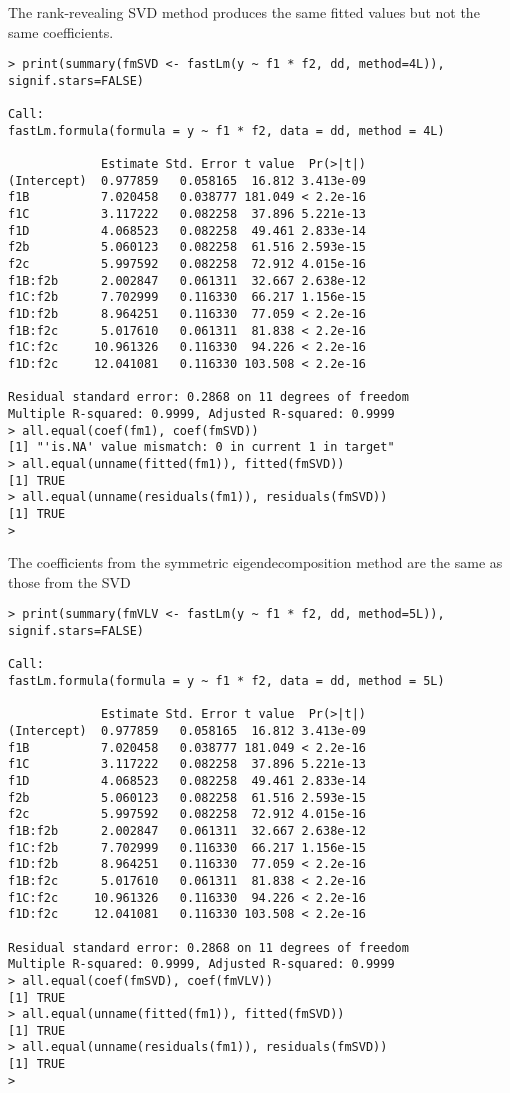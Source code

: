 \documentclass[shortnames,article]{jss}
\begin{document}
The rank-revealing SVD method produces the same fitted
values but not the same coefficients.

\begin{verbatim}
> print(summary(fmSVD <- fastLm(y ~ f1 * f2, dd, method=4L)), signif.stars=FALSE)

Call:
fastLm.formula(formula = y ~ f1 * f2, data = dd, method = 4L)

             Estimate Std. Error t value  Pr(>|t|)
(Intercept)  0.977859   0.058165  16.812 3.413e-09
f1B          7.020458   0.038777 181.049 < 2.2e-16
f1C          3.117222   0.082258  37.896 5.221e-13
f1D          4.068523   0.082258  49.461 2.833e-14
f2b          5.060123   0.082258  61.516 2.593e-15
f2c          5.997592   0.082258  72.912 4.015e-16
f1B:f2b      2.002847   0.061311  32.667 2.638e-12
f1C:f2b      7.702999   0.116330  66.217 1.156e-15
f1D:f2b      8.964251   0.116330  77.059 < 2.2e-16
f1B:f2c      5.017610   0.061311  81.838 < 2.2e-16
f1C:f2c     10.961326   0.116330  94.226 < 2.2e-16
f1D:f2c     12.041081   0.116330 103.508 < 2.2e-16

Residual standard error: 0.2868 on 11 degrees of freedom
Multiple R-squared: 0.9999,	Adjusted R-squared: 0.9999
> all.equal(coef(fm1), coef(fmSVD))
[1] "'is.NA' value mismatch: 0 in current 1 in target"
> all.equal(unname(fitted(fm1)), fitted(fmSVD))
[1] TRUE
> all.equal(unname(residuals(fm1)), residuals(fmSVD))
[1] TRUE
> 
\end{verbatim}

The coefficients from the symmetric eigendecomposition method are the same as those from the SVD

\begin{verbatim}
> print(summary(fmVLV <- fastLm(y ~ f1 * f2, dd, method=5L)), signif.stars=FALSE)

Call:
fastLm.formula(formula = y ~ f1 * f2, data = dd, method = 5L)

             Estimate Std. Error t value  Pr(>|t|)
(Intercept)  0.977859   0.058165  16.812 3.413e-09
f1B          7.020458   0.038777 181.049 < 2.2e-16
f1C          3.117222   0.082258  37.896 5.221e-13
f1D          4.068523   0.082258  49.461 2.833e-14
f2b          5.060123   0.082258  61.516 2.593e-15
f2c          5.997592   0.082258  72.912 4.015e-16
f1B:f2b      2.002847   0.061311  32.667 2.638e-12
f1C:f2b      7.702999   0.116330  66.217 1.156e-15
f1D:f2b      8.964251   0.116330  77.059 < 2.2e-16
f1B:f2c      5.017610   0.061311  81.838 < 2.2e-16
f1C:f2c     10.961326   0.116330  94.226 < 2.2e-16
f1D:f2c     12.041081   0.116330 103.508 < 2.2e-16

Residual standard error: 0.2868 on 11 degrees of freedom
Multiple R-squared: 0.9999,	Adjusted R-squared: 0.9999
> all.equal(coef(fmSVD), coef(fmVLV))
[1] TRUE
> all.equal(unname(fitted(fm1)), fitted(fmSVD))
[1] TRUE
> all.equal(unname(residuals(fm1)), residuals(fmSVD))
[1] TRUE
> 
\end{verbatim}
\end{document}

